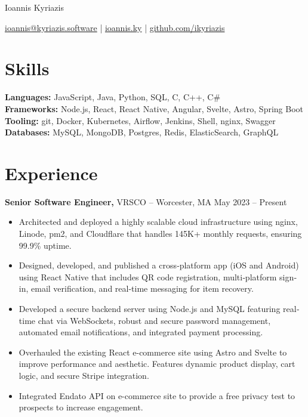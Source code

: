 \documentclass[11pt]{article}       %
\begin{document}
\centerline{\Huge Ioannis Kyriazis}

\vspace{5pt}

\centerline{\href{mailto:ioannis@kyriazis.software}{ioannis@kyriazis.software} | \href{https://ioannis.ky}{ioannis.ky} | \href{https://github.com/ikyriazis}{github.com/ikyriazis}}

\vspace{-10pt}

\section*{Skills}
\textbf{Languages:} JavaScript, Java, Python, SQL, C, C++, C\# \\
\textbf{Frameworks:} Node.js, React, React Native, Angular, Svelte, Astro, Spring Boot \\
\textbf{Tooling:} git, Docker, Kubernetes, Airflow, Jenkins, Shell, nginx, Swagger \\
\textbf{Databases:} MySQL, MongoDB, Postgres, Redis, ElasticSearch, GraphQL


\vspace{-6.5pt}

\section*{Experience}
\textbf{Senior Software Engineer,} {VRSCO} -- Worcester, MA \hfill May 2023 -- Present \\
\vspace{-9pt}
\begin{itemize}
  \item Architected and deployed a highly scalable cloud infrastructure using nginx, Linode, pm2, and Cloudflare that handles 145K+ monthly requests, ensuring 99.9\% uptime.
  \item Designed, developed, and published a cross‐platform app (iOS and Android) using React Native that includes QR code registration, multi‐platform sign‐in, email verification, and real-time messaging for item recovery.
  \item Developed a secure backend server using Node.js and MySQL featuring real‐time chat via WebSockets, robust and secure password management, automated email notifications, and integrated payment processing.
  \item Overhauled the existing React e-commerce site using Astro and Svelte to improve performance and aesthetic. Features dynamic product display, cart logic, and secure Stripe integration.
  \item Integrated Endato API on e-commerce site to provide a free privacy test to prospects to increase engagement.
\end{itemize}
\end{document}
